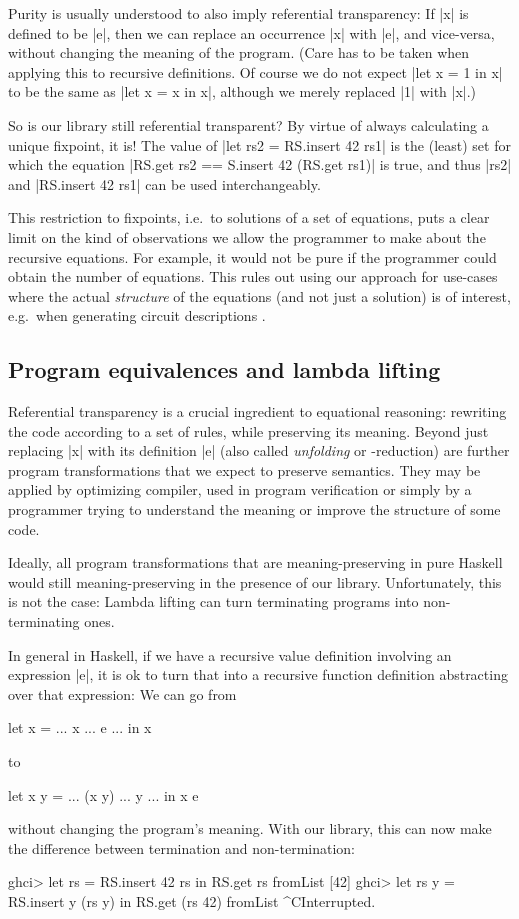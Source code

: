 \documentclass[manuscript,review,screen,acmsmall]{acmart}
\begin{document}
Purity is usually understood to also imply referential transparency: If |x| is defined to be |e|, then we can replace an occurrence |x| with |e|, and vice-versa, without changing the meaning of the program.
(Care has to be taken when applying this to recursive definitions. Of course we do not expect |let x = 1 in x| to be the same as |let x = x in x|, although we merely replaced |1| with |x|.)

So is our library still referential transparent? By virtue of always calculating a unique fixpoint, it is!  The value of |let rs2 = RS.insert 42 rs1| is the (least) set for which the equation |RS.get rs2 == S.insert 42 (RS.get rs1)| is true, and thus |rs2| and |RS.insert 42 rs1| can be used interchangeably.

This restriction to fixpoints, i.e.\ to solutions of a set of equations, puts a clear limit on the kind of observations we allow the programmer to make about the recursive equations. For example, it would not be pure if the programmer could obtain the number of equations. This rules out using our approach for use-cases where the actual \emph{structure} of the equations (and not just a solution) is of interest, e.g.\ when generating circuit descriptions \cite{observable-sharing}.

\subsection{Program equivalences and lambda lifting}\label{sec:sat}

Referential transparency is a crucial ingredient to equational reasoning: rewriting the code according to a set of rules, while preserving its meaning. Beyond just replacing |x| with its definition |e| (also called \emph{unfolding} or \textdelta-reduction) are further program transformations that we expect to preserve semantics. They may be applied by optimizing compiler, used in program verification or simply by a programmer trying to understand the meaning or improve the structure of some code.

Ideally, all program transformations that are meaning-preserving in pure Haskell would still meaning-preserving in the presence of our library. Unfortunately, this is not the case: Lambda lifting can turn terminating programs into non-terminating ones.

In general in Haskell, if we have a recursive value definition involving an expression |e|, it is ok to turn that into a recursive function definition abstracting over that expression: We can go from
\begin{code}
let x = ... x ... e ... in x
\end{code}
to
\begin{code}
let x y = ... (x y) ... y ... in x e
\end{code}
without changing the program's meaning. With our library, this can now make the difference between termination and non-termination:
\begin{code}
ghci> let rs = RS.insert 42 rs in RS.get rs
fromList [42]
ghci> let rs y = RS.insert y (rs y) in RS.get (rs 42)
fromList ^CInterrupted.
\end{code}
\end{document}
